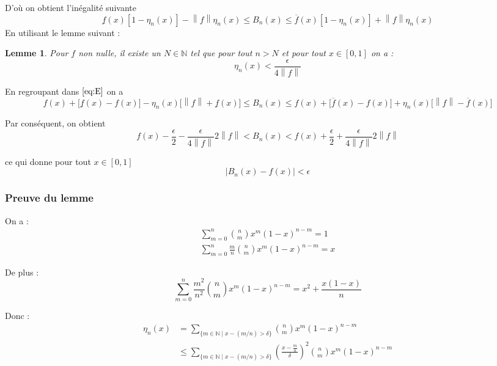 \documentclass[
	10pt, %
	xcolor={svgnames}
]{beamer}
\newtheorem{lemme}[subsubsection]{Lemme}
\begin{document}
\begin{frame}
	D'où on obtient l'inégalité suivante 
	\begin{equation}
		\underline{f}(x)[1 - \eta_n(x)] - {\left\lVert f \right\rVert} \eta_n(x)
		\leq B_n(x) \leq \overline{f}(x)[1-\eta_n(x)] + {\left\lVert f \right\rVert} \eta_n(x) \label{eq:E}
	\end{equation}
	En utilisant le lemme suivant :
	\begin{lemme}
	Pour \( f \) non nulle, il existe un \( N \in \mathbb{N} \) tel que pour tout \( n > N \) et pour tout \( x \in [0,1] \) on a :
	\begin{equation} 
		\eta_n(x) < \frac{\epsilon}{4 {\left\lVert f \right\rVert}} 
	\end{equation}
	\end{lemme}
	En regroupant dans \( \eqref{eq:E} \) on a
	{\footnotesize
	\begin{equation*}
	f(x) + \lbrack \underline{f}(x)-f(x)\rbrack - 
		\eta_n(x) \lbrack {\left\lVert f \right\rVert} + \underline{f}(x)\rbrack 
		\leq B_n(x) \leq f(x) + \lbrack \overline{f}(x) - f(x) \rbrack 
	+ \eta_n(x) \lbrack {\left\lVert f \right\rVert}-\overline{f}(x) \rbrack
	\end{equation*}
	}

	Par conséquent, on obtient
	\begin{equation*}
		f(x)-\frac{\epsilon}{2} - 
		\frac{\epsilon}{4 {\left\lVert f \right\rVert}} 2{\left\lVert f \right\rVert}
		< B_n(x) < f(x) + \frac{\epsilon}{2}+\frac{\epsilon}{4 {\left\lVert f \right\rVert}} 2{\left\lVert f \right\rVert}
	\end{equation*}

	ce qui donne pour tout \( x \in [0,1] \)
	\begin{equation*}
		{\left\lvert B_n(x) - f(x) \right\rvert} < \epsilon
	\end{equation*}
	\end{frame}
\begin{frame}
	\frametitle{Preuve du lemme}

On a :
\begin{align*}
	\sum_{m=0}^{n} \binom{n}{m} x^{m}(1-x)^{n-m} = 1 \\
	\sum_{m=0}^{n} \frac{m}{n} \binom{n}{m} x^{m}(1-x)^{n-m} = x
\end{align*}

De plus :
\begin{equation*}
	\sum_{m=0}^{n} \frac{m^{2}}{n^{2}} \binom{n}{m} x^{m}(1-x)^{n-m} = x^{2} + \frac{x(1-x)}{n}
\end{equation*}

Donc : 
\begin{align*}
	\eta_n(x) &= \sum_{\{m \in \mathbb{N} \mid x - (m/n) > \delta \}}  \binom{n}{m} x^{m}(1-x)^{n-m} \\
	&\leq \sum_{\{m \in \mathbb{N} \mid x - (m/n) > \delta \}} (\frac{x-\frac{m}{n}}{\delta})^{2} \binom{n}{m} x^{m}(1-x)^{n-m}
\end{align*}

\end{frame}
\end{document}
